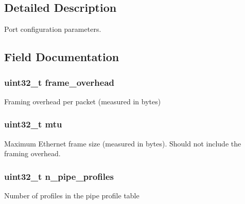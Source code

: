 \subsection{Detailed Description}
Port configuration parameters. 

\subsection{Field Documentation}
\hypertarget{structrte__sched__port__params_a0f2c854b2c7f05f1e31a929b9c070438}{}
\subsubsection[{frame\+\_\+overhead}]{\setlength{\rightskip}{0pt plus 5cm}uint32\+\_\+t frame\+\_\+overhead}\label{structrte__sched__port__params_a0f2c854b2c7f05f1e31a929b9c070438}
Framing overhead per packet (measured in bytes) \hypertarget{structrte__sched__port__params_a3c8ee4e9dd2a5354e83fb30c95598f30}{}
\subsubsection[{mtu}]{\setlength{\rightskip}{0pt plus 5cm}uint32\+\_\+t mtu}\label{structrte__sched__port__params_a3c8ee4e9dd2a5354e83fb30c95598f30}
Maximum Ethernet frame size (measured in bytes). Should not include the framing overhead. \hypertarget{structrte__sched__port__params_a2b738077966491798fdf273913b2f4b2}{}
\subsubsection[{n\+\_\+pipe\+\_\+profiles}]{\setlength{\rightskip}{0pt plus 5cm}uint32\+\_\+t n\+\_\+pipe\+\_\+profiles}\label{structrte__sched__port__params_a2b738077966491798fdf273913b2f4b2}
Number of profiles in the pipe profile table \hypertarget{structrte__sched__port__params_ab560ed2b4d276da9403539787fd2ecad}{}
